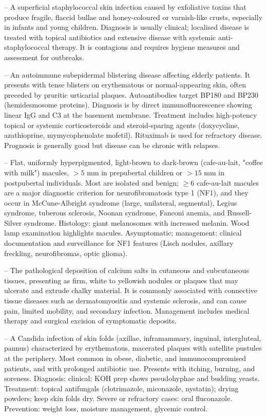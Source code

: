 -- A superficial staphylococcal skin infection caused by exfoliative toxins that produce fragile, flaccid bullae and honey-coloured or varnish-like crusts, especially in infants and young children. Diagnosis is usually clinical; localised disease is treated with topical antibiotics and extensive disease with systemic anti-staphylococcal therapy. It is contagious and requires hygiene measures and assessment for outbreaks.

-- An autoimmune subepidermal blistering disease affecting elderly patients. It presents with tense blisters on erythematous or normal-appearing skin, often preceded by pruritic urticarial plaques. Autoantibodies target BP180 and BP230 (hemidesmosome proteins). Diagnosis is by direct immunofluorescence showing linear IgG and C3 at the basement membrane. Treatment includes high-potency topical or systemic corticosteroids and steroid-sparing agents (doxycycline, azathioprine, mymycophenolate mofetil). Rituximab is used for refractory disease. Prognosis is generally good but disease can be chronic with relapses.

-- Flat, uniformly hyperpigmented, light-brown to dark-brown (cafe-au-lait, "coffee with milk") macules, $> 5$ mm in prepubertal children or $> 15$ mm in postpubertal individuals. Most are isolated and benign; $\ge 6$ cafe-au-lait macules are a major diagnostic criterion for neurofibromatosis type 1 (NF1), and they occur in McCune-Albright syndrome (large, unilateral, segmental), Legius syndrome, tuberous sclerosis, Noonan syndrome, Fanconi anemia, and Russell-Silver syndrome. Histology: giant melanosomes with increased melanin. Wood lamp examination highlights macules. Asymptomatic; management: clinical documentation and surveillance for NF1 features (Lisch nodules, axillary freckling, neurofibromas, optic glioma).

-- The pathological deposition of calcium salts in cutaneous and subcutaneous tissues, presenting as firm, white to yellowish nodules or plaques that may ulcerate and extrude chalky material. It is commonly associated with connective tissue diseases such as dermatomyositis and systemic sclerosis, and can cause pain, limited mobility, and secondary infection. Management includes medical therapy and surgical excision of symptomatic deposits.

-- A Candida infection of skin folds (axillae, inframammary, inguinal, intergluteal, pannus) characterized by erythematous, macerated plaques with satellite pustules at the periphery. Most common in obese, diabetic, and immunocompromised patients, and with prolonged antibiotic use. Presents with itching, burning, and soreness. Diagnosis: clinical; KOH prep shows pseudohyphae and budding yeasts. Treatment: topical antifungals (clotrimazole, miconazole, nystatin); drying powders; keep skin folds dry. Severe or refractory cases: oral fluconazole. Prevention: weight loss, moisture management, glycemic control.

